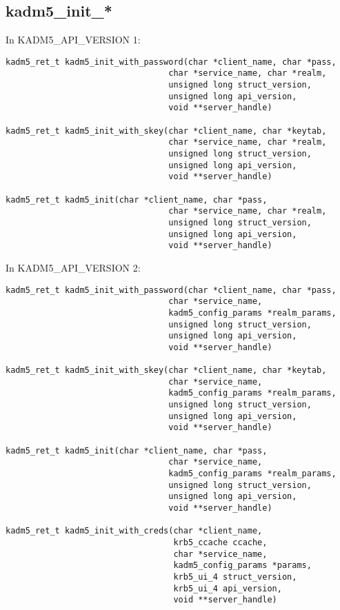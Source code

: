 \subsection{kadm5_init_*}

In KADM5_API_VERSION 1:

\begin{verbatim}
kadm5_ret_t kadm5_init_with_password(char *client_name, char *pass,
                                 char *service_name, char *realm,
                                 unsigned long struct_version,
                                 unsigned long api_version,
                                 void **server_handle)

kadm5_ret_t kadm5_init_with_skey(char *client_name, char *keytab,
                                 char *service_name, char *realm,
                                 unsigned long struct_version,
                                 unsigned long api_version,
                                 void **server_handle)

kadm5_ret_t kadm5_init(char *client_name, char *pass,
                                 char *service_name, char *realm,
                                 unsigned long struct_version,
                                 unsigned long api_version,
                                 void **server_handle)
\end{verbatim}

In KADM5_API_VERSION 2:

\begin{verbatim}
kadm5_ret_t kadm5_init_with_password(char *client_name, char *pass,
                                 char *service_name,
                                 kadm5_config_params *realm_params,
                                 unsigned long struct_version,
                                 unsigned long api_version,
                                 void **server_handle)

kadm5_ret_t kadm5_init_with_skey(char *client_name, char *keytab,
                                 char *service_name,
                                 kadm5_config_params *realm_params,
                                 unsigned long struct_version,
                                 unsigned long api_version,
                                 void **server_handle)

kadm5_ret_t kadm5_init(char *client_name, char *pass,
                                 char *service_name,
                                 kadm5_config_params *realm_params,
                                 unsigned long struct_version,
                                 unsigned long api_version,
                                 void **server_handle)

kadm5_ret_t kadm5_init_with_creds(char *client_name,
                                  krb5_ccache ccache,
                                  char *service_name,
                                  kadm5_config_params *params,
                                  krb5_ui_4 struct_version,
                                  krb5_ui_4 api_version,
                                  void **server_handle)
\end{verbatim}

